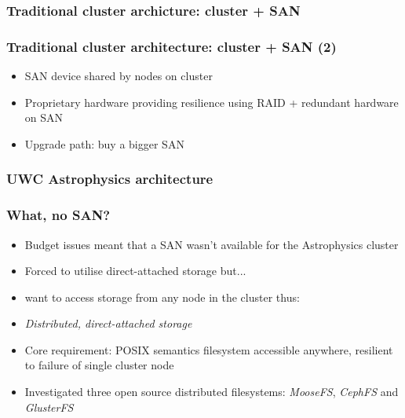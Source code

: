 \documentclass[handout]{beamer}
\begin{document}
\begin{frame}
\frametitle{Traditional cluster archicture: cluster + SAN}
\end{frame}

\begin{frame}
\frametitle{Traditional cluster architecture: cluster + SAN (2)}
\begin{itemize}
\item SAN device shared by nodes on cluster
\item Proprietary hardware providing resilience using RAID + redundant hardware on SAN
\item Upgrade path: buy a bigger SAN
\end{itemize}
\end{frame}

\begin{frame}
\frametitle{UWC Astrophysics architecture}
\end{frame}

\begin{frame}
\frametitle{What, no SAN?}
\begin{itemize}
\item Budget issues meant that a SAN wasn't available for the Astrophysics cluster
\pause
\item Forced to utilise direct-attached storage but...
\pause
\item want to access storage from any node in the cluster thus:
\pause
\item \emph{Distributed, direct-attached storage}
\pause
\item Core requirement: POSIX semantics filesystem accessible anywhere, resilient to failure of single cluster node
\pause
\item Investigated three open source distributed filesystems: \emph{MooseFS}, \emph{CephFS} and \emph{GlusterFS} 
\end{itemize}
\end{frame}
\end{document}
